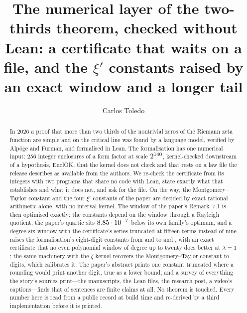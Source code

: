 \documentclass[preprint,11pt,authoryear,a4paper]{elsarticle}
\begin{document}
\begin{frontmatter}

\title{The numerical layer of the two-thirds theorem, checked without Lean: a certificate that waits on a file, and the $\xi'$ constants raised by an exact window and a longer tail}

\author[a]{Carlos Toledo}

\begin{abstract}
In 2026 a proof that more than two thirds of the nontrivial zeros of the Riemann zeta function are simple and on the critical line was found by a language model, verified by Alp\"oge and Furman, and formalised in Lean. The formalisation has one numerical input: 256 integer enclosures of a form factor at scale $2^{140}$, kernel-checked downstream of a hypothesis, EnclOK, that the kernel does not check and that rests on a law file the release describes as available from the authors. We re-check the certificate from its integers with two programs that share no code with Lean, state exactly what that establishes and what it does not, and ask for the file. On the way, the Montgomery--Taylor constant and the four $\xi'$ constants of the paper are decided by exact rational arithmetic alone, with no interval kernel. The window of the paper's Remark~7.1 is then optimised exactly: the constants depend on the window through a Rayleigh quotient, the paper's quartic sits $8.85\cdot10^{-7}$ below its own family's optimum, and a degree-six window with the certificate's series truncated at fifteen terms instead of nine raises the formalisation's eight-digit constants from \RfLeanP{} and \RfLeanD{} to \RfNewP{} and \RfNewD, with an exact certificate that no even polynomial window of degree up to twenty does better at $\lambda=1$; the same machinery with the $\zeta$ kernel recovers the Montgomery--Taylor constant to \RfMtAgreeDigits{} digits, which calibrates it. The paper's abstract prints one constant truncated where a rounding would print another digit, true as a lower bound; and a survey of everything the story's sources print---the manuscripts, the Lean files, the research post, a video's captions---finds that \RfShaped{} of \RfSentences{} sentences are finite claims at all. No theorem is touched. Every number here is read from a public record at build time and re-derived by a third implementation before it is printed.
\end{abstract}


\end{frontmatter}
\end{document}
